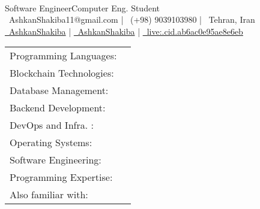 \documentclass[]{awesome-cv}
\begin{document}
    
\begin{center}
	  \\
	\vspace{2mm}
	\textcolor{awesome}{Software Engineer{\enskip\cdotp\enskip}Computer Eng. Student} \\
	\vspace{2mm}
	{\faEnvelope\ AshkanShakiba11@gmail.com} | {\faMobile\ (+98) 9039103980} | {\faMapMarker\ Tehran, Iran} \\
	{\href{https://linkedin.com/in/AshkanShakiba}{\faLinkedin\ AshkanShakiba}} | {\href{https://github.com/AshkanShakiba}{\faGithub\ AshkanShakiba}} | {\href{skype:live:.cid.ab6ac0e95ae8e6eb?chat}{\faSkype\ live:.cid.ab6ac0e95ae8e6eb}}
\end{center}
\begin{cventries}
	\cventry
	{}
	{\def\arraystretch{1.15}{\begin{tabular}{ l l }
		\vspace{0.25mm}Programming Languages:  & {\skill{ Go, Python, Java, JavaScript, TypeScript}} \\
		\vspace{0.25mm} Blockchain Technologies: & {\skill{ Solidity, Smart Contracts, Web3, Brownie, Remix IDE}} \\
		\vspace{0.25mm}Database Management:  & {\skill{ SQL, MySQL, PostgreSQL, Elasticsearch, Redis}} \\
		\vspace{0.25mm}Backend Development:  & {\skill{ Django, Django REST framework, Node.js}} \\
		\vspace{0.25mm}DevOps and Infra. :  & {\skill{ Git, Docker, Apache Kafka, GitLab CI/CD}} \\
		\vspace{0.25mm}Operating Systems:  & {\skill{ Linux, macOS, Windows}} \\
		\vspace{0.25mm}Software Engineering:  & {\skill{ Agile and Scrum, Design Patterns, Testing}} \\
		\vspace{0.25mm}Programming Expertise:  & {\skill{ Data Structures and Algorithms, Object-oriented Programming, Microservices}} \\
		\vspace{0.25mm}Also familiar with:  & {\skill{ Kubernetes, RabbitMQ, Selenium, Flask, Kotlin, C}} \\
		\end{tabular}}}
	{}
	{}
	{}
\end{cventries}
\end{document}
